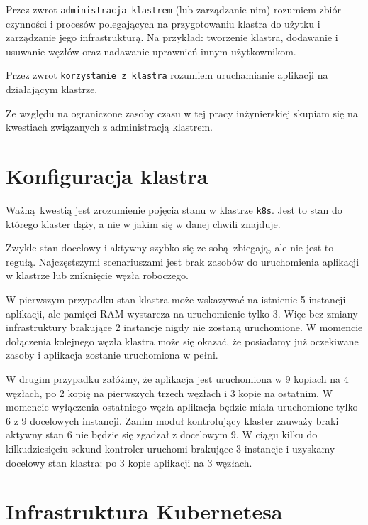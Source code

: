\documentclass[a4paper,12pt,twoside,openany]{report}
\newcommand{\passthrough}[1]{#1}
\begin{document}
Przez zwrot \passthrough{\lstinline!administracja klastrem!} (lub
zarządzanie nim) rozumiem zbiór czynności i procesów polegających na
przygotowaniu klastra do użytku i zarządzanie jego infrastrukturą. Na
przykład: tworzenie klastra, dodawanie i usuwanie węzłów oraz nadawanie
uprawnień innym użytkownikom.

Przez zwrot \passthrough{\lstinline!korzystanie z klastra!} rozumiem
uruchamianie aplikacji na działającym klastrze.

Ze względu na ograniczone zasoby czasu w tej pracy inżynierskiej skupiam
się na kwestiach związanych z administracją klastrem.

\hypertarget{konfiguracja-klastra}{%
\section{Konfiguracja klastra}\label{konfiguracja-klastra}}

Ważną~kwestią jest zrozumienie pojęcia stanu w klastrze
\passthrough{\lstinline!k8s!}. Jest to stan do którego klaster dąży, a
nie w jakim się w danej chwili znajduje.

Zwykle stan docelowy i aktywny szybko się ze sobą~zbiegają, ale nie jest
to regułą. Najczęstszymi scenariuszami jest brak zasobów do uruchomienia
aplikacji w klastrze lub zniknięcie węzła roboczego.

W pierwszym przypadku stan klastra może wskazywać na istnienie 5
instancji aplikacji, ale pamięci RAM wystarcza na uruchomienie tylko 3.
Więc bez zmiany infrastruktury brakujące 2 instancje nigdy nie zostaną
uruchomione. W momencie dołączenia kolejnego węzła klastra może się
okazać, że posiadamy już oczekiwane zasoby i aplikacja zostanie
uruchomiona w pełni.

W drugim przypadku załóżmy, że aplikacja jest uruchomiona w 9 kopiach na
4 węzłach, po 2 kopię na pierwszych trzech węzłach i 3 kopie na
ostatnim. W momencie wyłączenia ostatniego węzła aplikacja będzie miała
uruchomione tylko 6 z 9 docelowych instancji. Zanim moduł kontrolujący
klaster zauważy braki aktywny stan 6 nie będzie się zgadzał z docelowym
9. W ciągu kilku do kilkudziesięciu sekund kontroler uruchomi brakujące
3 instancje i uzyskamy docelowy stan klastra: po 3 kopie aplikacji na 3
węzłach.

\hypertarget{infrastruktura-kubernetesa}{%
\section{Infrastruktura Kubernetesa}\label{infrastruktura-kubernetesa}}
\end{document}
